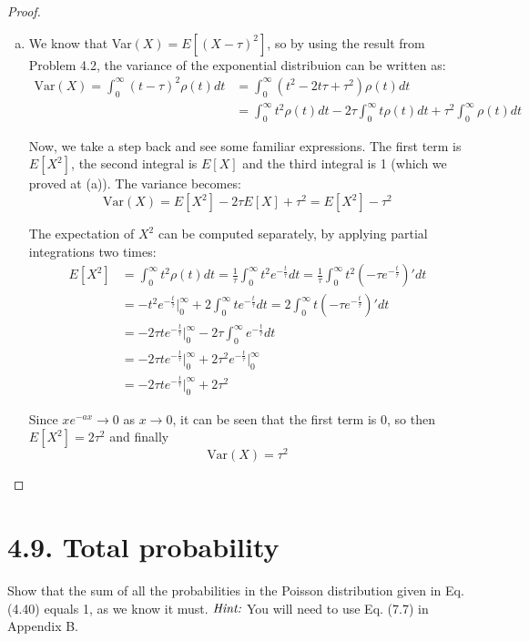 \begin{proof}
\begin{enumerate}[(a)]
        \item We know that Var$(X) = E[(X - \tau)^2]$, so by using the result from
            Problem 4.2, the variance of the exponential distribuion can
            be written as:
            \begin{align*}
                \text{Var}(X) = \int_0^\infty (t - \tau)^2 \rho(t) dt
                &= \int_0^\infty (t^2 - 2t\tau + \tau^2) \rho(t) dt \\
                &= \int_0^\infty t^2\rho(t) dt - 2\tau \int_0^\infty t \rho(t)dt + \tau^2 \int_0^\infty \rho(t) dt
            \end{align*}

        Now, we take a step back and see some familiar expressions. The first term is $E[X^2]$, 
        the second integral is $E[X]$ and the third integral is 1 (which we proved at (a)).
        The variance becomes:
        \[
            \text{Var}(X) = E[X^2] - 2\tau E[X] + \tau^2 = E[X^2] - \tau^2
        \] 

        The expectation of $X^2$ can be computed separately, by applying partial integrations two times:
        \begin{align*}
            E[X^2] &= \int_0^\infty t^2 \rho(t)dt 
            = \frac{1}{\tau} \int_0^\infty t^2 e^{-\frac{t}{\tau}} dt
            = \frac{1}{\tau} \int_0^\infty t^2 (-\tau e^{-\frac{t}{\tau}})' dt \\
            &= -t^2 e^{-\frac{t}{\tau}}\bigg|_0^\infty + 2\int_0^\infty t e^{-\frac{t}{\tau}} dt 
            = 2\int_0^\infty t(-\tau e^{-\frac{t}{\tau}})' dt \\
            &= -2\tau te^{-\frac{t}{\tau}} \bigg|_0^\infty - 2\tau \int_0^\infty e^{-\frac{t}{\tau}} dt \\
            &= -2\tau te^{-\frac{t}{\tau}} \bigg|_0^\infty + 2\tau^2 e^{-\frac{t}{\tau}}\bigg|_0^\infty \\
            &= -2\tau te^{-\frac{t}{\tau}} \bigg|_0^\infty + 2\tau^2 
        \end{align*}

        Since $xe^{-ax} \to 0$ as $x \to 0$, it can be seen that the first term is 0, so
        then $E[X^2] = 2\tau^2$ and finally
        \[
            \text{Var}(X) = \tau^2
        \] 
    \end{enumerate}
\end{proof}

\section*{4.9. Total probability}
Show that the sum of all the probabilities in the Poisson distribution given
in Eq. (4.40) equals 1, as we know it must. $\emph{Hint:}$ You will need to use
Eq. (7.7) in Appendix B.

